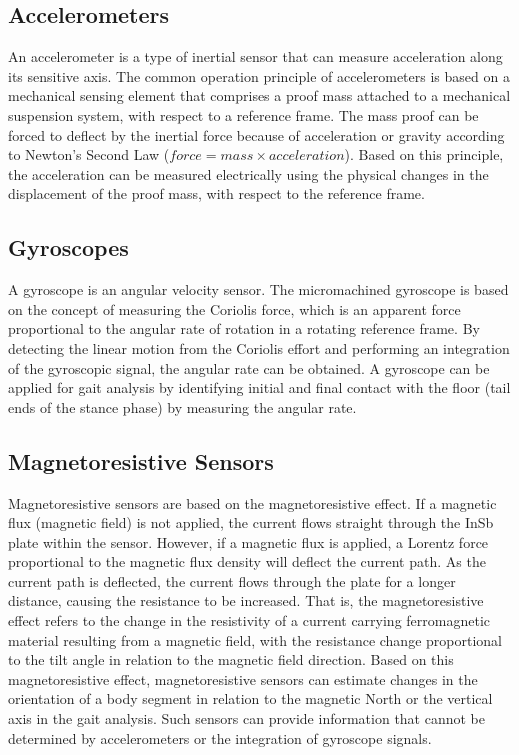 \documentclass[11pt, oneside]{report}
\begin{document}
\subsection{Accelerometers}

An accelerometer is a type of inertial sensor that can measure acceleration along its sensitive axis\cite{Tao2012}. The common operation principle of accelerometers is based on a mechanical sensing element that comprises a proof mass attached to a mechanical suspension system, with respect to a reference frame\cite{Tao2012}. The mass proof can be forced to deflect by the inertial force because of acceleration or gravity according to Newton's Second Law ($force = mass \times acceleration$). Based on this principle, the acceleration can be measured electrically using the physical changes in the displacement of the proof mass, with respect to the reference frame\cite{Tao2012}.

\subsection{Gyroscopes}

A gyroscope is an angular velocity sensor. The micromachined gyroscope is based on the concept of measuring the Coriolis force, which is an apparent force proportional to the angular rate of rotation in a rotating reference frame\cite{Tao2012}. By detecting the linear motion from the Coriolis effort and performing an integration of the gyroscopic signal, the angular rate can be obtained\cite{Tao2012}. A gyroscope can be applied for gait analysis by identifying initial and final contact with the floor (tail ends of the stance phase) by measuring the angular rate\cite{Catalfamo2010}.

\subsection{Magnetoresistive Sensors}

Magnetoresistive sensors are based on the magnetoresistive effect\cite{Tao2012}. If a magnetic flux (magnetic field) is not applied, the current flows straight through the InSb plate within the sensor. However, if a magnetic flux is applied, a Lorentz force proportional to the magnetic flux density will deflect the current path. As the current path is deflected, the current flows through the plate for a longer distance, causing the resistance to be increased\cite{Tao2012}. That is, the magnetoresistive effect refers to the change in the resistivity of a current carrying ferromagnetic material resulting from a magnetic field, with the resistance change proportional to the tilt angle in relation to the magnetic field direction\cite{Graham2004}. Based on this magnetoresistive effect, magnetoresistive sensors can estimate changes in the orientation of a body segment in relation to the magnetic North or the vertical axis in the gait analysis\cite{Choi2008}. Such sensors can provide information that cannot be determined by accelerometers or the integration of gyroscope signals\cite{Tao2012}.
\end{document}
